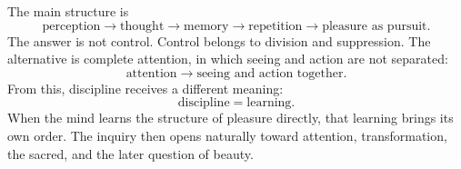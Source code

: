The main structure is
\begin{equation}
\text{perception}
\longrightarrow
\text{thought}
\longrightarrow
\text{memory}
\longrightarrow
\text{repetition}
\longrightarrow
\text{pleasure as pursuit}.
\end{equation}
The answer is not control. Control belongs to division and suppression. The alternative is complete attention, in which seeing and action are not separated:
\begin{equation}
\text{attention}
\longrightarrow
\text{seeing and action together}.
\end{equation}
From this, discipline receives a different meaning:
\begin{equation}
\text{discipline}
=
\text{learning}.
\end{equation}
When the mind learns the structure of pleasure directly, that learning brings its own order. The inquiry then opens naturally toward attention, transformation, the sacred, and the later question of beauty.